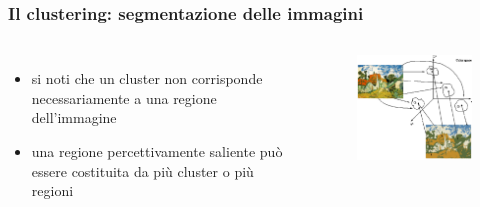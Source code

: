 \begin{frame}

	\frametitle{Il clustering: segmentazione delle immagini}


		\begin{columns}

			\begin{itemize}
				\item si noti che un cluster non corrisponde necessariamente a una regione dell'immagine
				\item una regione percettivamente saliente può essere costituita da più cluster o più regioni
			\end{itemize}

			\begin{figure}[!htbp]
				\centering
				\includegraphics[width=6.0cm]{images/unsupervised/image_segmentation/image_segmentation.png}
			\end{figure}

		\end{columns}


\end{frame}


